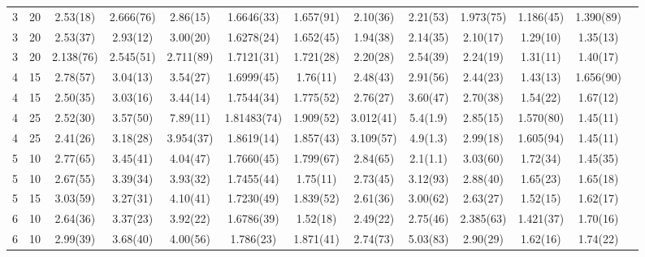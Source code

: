 \begin{tabular}{rr|ccccccccccc}
3 & 20 & 2.53(18) & 2.666(76) & 2.86(15) & 1.6646(33) & 1.657(91) & 2.10(36) & 2.21(53) & 1.973(75) & 1.186(45) & 1.390(89) \\
3 & 20 & 2.53(37) & 2.93(12) & 3.00(20) & 1.6278(24) & 1.652(45) & 1.94(38) & 2.14(35) & 2.10(17) & 1.29(10) & 1.35(13) \\
3 & 20 & 2.138(76) & 2.545(51) & 2.711(89) & 1.7121(31) & 1.721(28) & 2.20(28) & 2.54(39) & 2.24(19) & 1.31(11) & 1.40(17) \\
4 & 15 & 2.78(57) & 3.04(13) & 3.54(27) & 1.6999(45) & 1.76(11) & 2.48(43) & 2.91(56) & 2.44(23) & 1.43(13) & 1.656(90) \\
4 & 15 & 2.50(35) & 3.03(16) & 3.44(14) & 1.7544(34) & 1.775(52) & 2.76(27) & 3.60(47) & 2.70(38) & 1.54(22) & 1.67(12) \\
4 & 25 & 2.52(30) & 3.57(50) & 7.89(11) & 1.81483(74) & 1.909(52) & 3.012(41) & 5.4(1.9) & 2.85(15) & 1.570(80) & 1.45(11) \\
4 & 25 & 2.41(26) & 3.18(28) & 3.954(37) & 1.8619(14) & 1.857(43) & 3.109(57) & 4.9(1.3) & 2.99(18) & 1.605(94) & 1.45(11) \\
5 & 10 & 2.77(65) & 3.45(41) & 4.04(47) & 1.7660(45) & 1.799(67) & 2.84(65) & 2.1(1.1) & 3.03(60) & 1.72(34) & 1.45(35) \\
5 & 10 & 2.67(55) & 3.39(34) & 3.93(32) & 1.7455(44) & 1.75(11) & 2.73(45) & 3.12(93) & 2.88(40) & 1.65(23) & 1.65(18) \\
5 & 15 & 3.03(59) & 3.27(31) & 4.10(41) & 1.7230(49) & 1.839(52) & 2.61(36) & 3.00(62) & 2.63(27) & 1.52(15) & 1.62(17) \\
6 & 10 & 2.64(36) & 3.37(23) & 3.92(22) & 1.6786(39) & 1.52(18) & 2.49(22) & 2.75(46) & 2.385(63) & 1.421(37) & 1.70(16) \\
6 & 10 & 2.99(39) & 3.68(40) & 4.00(56) & 1.786(23) & 1.871(41) & 2.74(73) & 5.03(83) & 2.90(29) & 1.62(16) & 1.74(22) \\
\bottomrule
\end{tabular}
